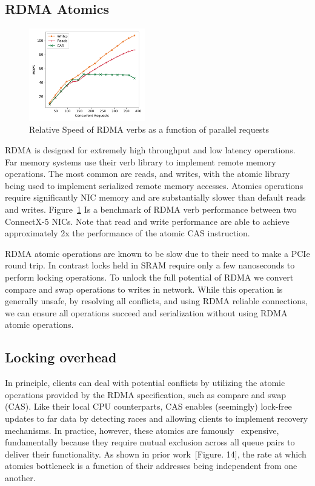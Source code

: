 \subsection{RDMA Atomics}

\begin{figure}[t]
    \includegraphics[width=0.45\textwidth]{fig/rdma_concur.pdf}
    \caption{Relative Speed of RDMA verbs as a function of parallel requests}
    \label{fig:rdma_concur}
\end{figure}



RDMA is designed for extremely high throughput and low latency operations. Far
memory systems use their verb library to implement remote memory operations. The
most common are reads, and writes, with the atomic library being used to
implement serialized remote memory accesses. Atomics operations require
significantly NIC memory and are substantially slower than default reads and
writes. Figure~\ref{fig:rdma_concur} Is a benchmark of RDMA verb performance
between two ConnectX-5 NICs. Note that read and write performance are able to
achieve approximately 2x the performance of the atomic CAS instruction.

RDMA atomic operations are known to be slow due to their need to make a PCIe
round trip. In contrast locks held in SRAM require only a few nanoseconds to
perform locking operations. To unlock the full potential of RDMA we convert
compare and swap operations to writes in network. While this operation is
generally unsafe, by resolving all conflicts, and using RDMA reliable
connections, we can ensure all operations succeed and serialization without
using RDMA atomic operations.

\subsection{Locking overhead}

In principle, clients can deal with potential conflicts by utilizing the atomic
operations provided by the RDMA specification, such as compare and swap (CAS).
Like their local CPU counterparts, CAS enables (seemingly) lock-free updates to
far data by detecting races and allowing clients to implement recovery
mechanisms. In practice, however, these atomics are
famously~\cite{design-guidelines,clover} expensive, fundamentally because they
require mutual exclusion across all queue pairs to deliver their functionality.
As shown in prior work~\cite{design-guidelines}[Figure. 14], the rate at which
atomics bottleneck is a function of their addresses being independent from one
another.

